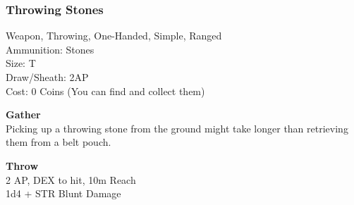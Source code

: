 \subsubsection{Throwing Stones}\label{weapon:throwingStones}
Weapon, Throwing, One-Handed, Simple, Ranged\\
Ammunition: Stones\\
Size: T\\
Draw/Sheath: 2AP\\
Cost: 0 Coins (You can find and collect them)

\textbf{Gather}\\
Picking up a throwing stone from the ground might take longer than retrieving them from a belt pouch.

\textbf{Throw}\\
2 AP, DEX to hit, 10m Reach\\
1d4 + \texttimes STR Blunt Damage

